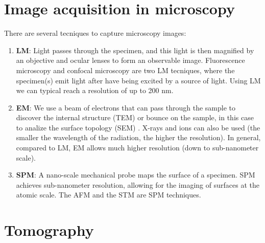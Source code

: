 \section{Image acquisition in microscopy}

There are several tecniques to capture microscopy images:

\begin{enumerate}
  \item \textbf{\gls{LM}}: Light passes through the specimen, and this light
  is then magnified by an objective and ocular lenses to form an
  observable image. Fluorescence microscopy and confocal microscopy
  are two \gls{LM} tecniques, where the specimen(s) emit light after
  have being excited by a source of light. Using \gls{LM} we can
  typical reach a resolution of up to 200 nm.

\item \textbf{\gls{EM}}: We use a beam of electrons that can pass
  through the sample to discover the internal structure (\gls{TEM}) or
  bounce on the sample, in this case to analize the surface topology
  (\gls{SEM}) \cite{timischl2012statistical}. X-rays and ions can also
  be used (the smaller the wavelength of the radiation, the higher the
  resolution). In general, compared to \gls{LM}, \gls{EM} allows much
  higher resolution (down to sub-nanometer scale).

\item \textbf{\gls{SPM}}: A nano-scale mechanical probe maps the surface of a
  specimen. \gls{SPM} achieves sub-nanometer resolution, allowing for
  the imaging of surfaces at the atomic scale. The \gls{AFM} and the
  \gls{STM} are \gls{SPM} techniques.

\end{enumerate}
  

\section{Tomography}

